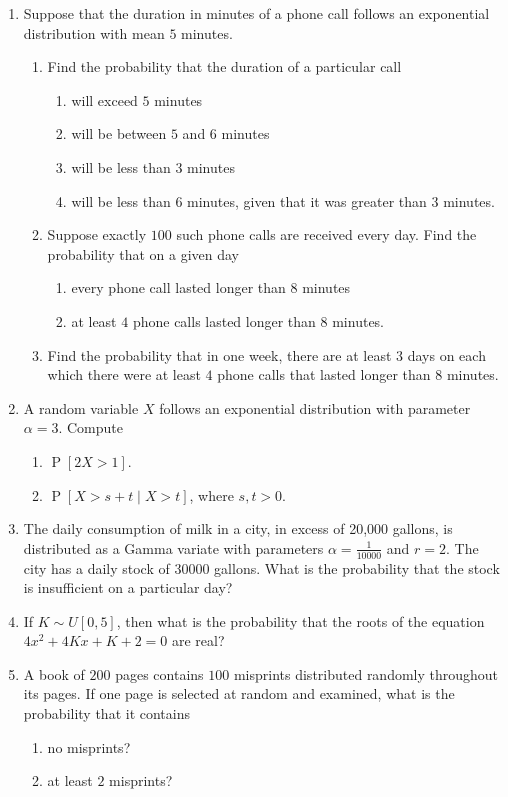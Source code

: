 \documentclass[svgnames]{amsart}
\DeclareMathOperator{\Prob}{P}
\begin{document}
\begin{enumerate}[leftmargin=*]
\item Suppose that the duration in minutes of a phone call follows an exponential distribution with mean $5$ minutes.
\begin{enumerate}
\item  Find the probability that the duration of a particular call
\begin{enumerate}
	\item will exceed $5$ minutes
	\item will be between $5$ and $6$ minutes
	\item will be less than $3$ minutes
	\item will be less than $6$ minutes, given that it was greater than $3$ minutes.
\end{enumerate}
\item Suppose exactly $100$ such phone calls are received every day. Find the probability that on a given day
\begin{enumerate}
	\item every phone call lasted longer than $8$ minutes
	\item at least $4$ phone calls lasted longer than $8$ minutes.
\end{enumerate}
\item Find the probability that in one week, there are at least $3$ days on each which there were at least $4$ phone calls that lasted longer than $8$ minutes.
\end{enumerate}

\item A random variable $X$ follows an exponential distribution with parameter $\alpha = 3$. Compute
\begin{enumerate}
	\item $\Prob[2X > 1]$.
	\item $\Prob[X > s + t \mid X > t]$, where $s, t > 0$.
\end{enumerate}

\item The daily consumption of milk in a city, in excess of 20,000 gallons, is distributed as a Gamma variate with parameters $\alpha = \frac 1 {10000}$ and $r = 2$. The city has a daily stock of $30000$ gallons. What is the probability that the stock is insufficient on a particular day?

\item If $K \sim U[0, 5]$, then what is the probability that the roots of the equation $4x^2 + 4Kx + K + 2 = 0$ are real?

\item A book of $200$ pages contains $100$ misprints distributed randomly throughout its pages. If one page is selected at random and examined, what is the probability that it contains
\begin{enumerate}
	\item no misprints?
	\item at least $2$ misprints?
\end{enumerate}


\end{enumerate}
\end{document}
